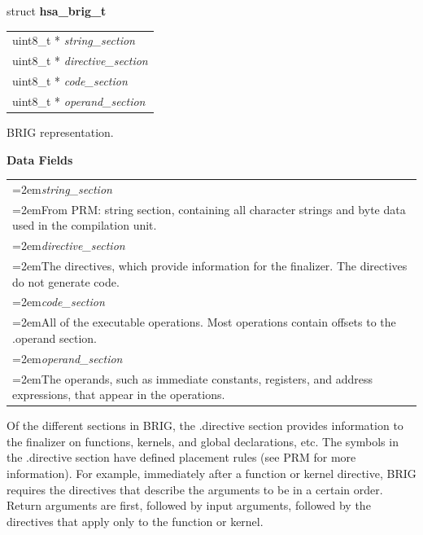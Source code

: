 \documentclass{book}
\newcommand{\hsaarg}[1]{\textit{#1}}
\newcommand{\hsadef}[2]{\hypertarget{#1}{\textbf{#2}}}
\begin{document}
\begin{appendices}
\makeatletter{}

\noindent\begin{tcolorbox}[nobeforeafter,arc=0mm,colframe=white,colback=lightgray,left=0mm]
struct \hsadef{group__STR__brig_1ga7b70cc1451b34e489b38395023467577}{hsa\_brig\_t} \\
\begin{tabular}{@{}l}
\hspace{1.7em}uint8\_t * \hsaarg{string\_section}\\
\hspace{1.7em}uint8\_t * \hsaarg{directive\_section}\\
\hspace{1.7em}uint8\_t * \hsaarg{code\_section}\\
\hspace{1.7em}uint8\_t * \hsaarg{operand\_section}
\end{tabular}

\end{tcolorbox}
BRIG representation.

\noindent\textbf{Data Fields}\\[-5mm]
\begin{longtable}{@{}>{\hangindent=2em}p{\textwidth}}
\hsaarg{string\_section}\\\hspace{2em}From PRM: string section, containing all character strings and byte data used in the compilation unit.\\[2mm]
\hsaarg{directive\_section}\\\hspace{2em}The directives, which provide information for the finalizer. The directives do not generate code.\\[2mm]
\hsaarg{code\_section}\\\hspace{2em}All of the executable operations. Most operations contain offsets to the .operand section.\\[2mm]
\hsaarg{operand\_section}\\\hspace{2em}The operands, such as immediate constants, registers, and address expressions, that appear in the operations.
\end{longtable}

 

Of the different sections in BRIG, the .directive section provides
information to the finalizer on functions, kernels, and global
declarations, etc. The symbols in the .directive section have defined
placement rules (see PRM for more information). For example,
immediately after a function or kernel directive, BRIG requires the
directives that describe the arguments to be in a certain order.
Return arguments are first, followed by input arguments, followed by
the directives that apply only to the function or kernel.


\end{appendices}
\end{document}

